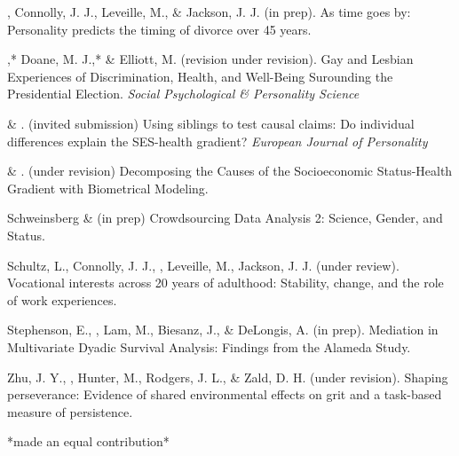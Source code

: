 
\item\meb, Connolly, J. J., Leveille, M., \& Jackson, J. J. (in prep). As time goes by: Personality predicts the timing of divorce over 45 years. %
\item\meb,* Doane, M. J.,* \& Elliott, M. (revision under revision). Gay and Lesbian Experiences of Discrimination, Health, and Well-Being Surounding the Presidential Election. \textit{Social Psychological \& Personality Science} %
\item \meb \& \joe. (invited submission) Using siblings to test causal claims: Do individual differences explain the SES-health gradient? \textit{European Journal of Personality}
\item \meb \& \joe.  (under revision) Decomposing the Causes of the Socioeconomic Status-Health Gradient with Biometrical Modeling. %
\item Schweinsberg \et \& \meb (in prep) Crowdsourcing Data Analysis 2: Science, Gender, and Status.
\item Schultz, L., Connolly, J. J., \meb, Leveille, M., Jackson, J. J. (under review). Vocational interests across 20 years of adulthood: Stability, change, and the role of work experiences.%
\item Stephenson, E., \meb, Lam, M., Biesanz, J., \& DeLongis, A. (in prep). Mediation in Multivariate Dyadic Survival Analysis: Findings from the Alameda Study. %
\item Zhu, J. Y., \meb, Hunter, M., Rodgers, J. L., \& Zald, D. H. (under revision). Shaping perseverance: Evidence of shared environmental effects on grit and a task-based measure of persistence. %
\vspace{-2mm}\begin{center}\footnotesize{*made an equal contribution*}\end{center} \vspace{-3mm}
\vspace{-2mm}\begin{center}\end{center} \vspace{-4mm}